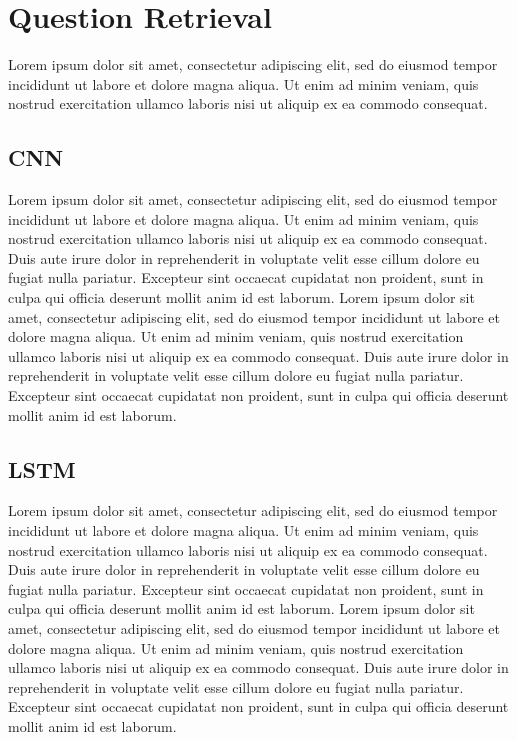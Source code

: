 \documentclass[12pt]{article}
\begin{document}
\section{Question Retrieval}
Lorem ipsum dolor sit amet, consectetur adipiscing elit, sed do eiusmod tempor incididunt ut labore et dolore magna aliqua. Ut enim ad minim veniam, quis nostrud exercitation ullamco laboris nisi ut aliquip ex ea commodo consequat.

\subsection{CNN}
Lorem ipsum dolor sit amet, consectetur adipiscing elit, sed do eiusmod tempor incididunt ut labore et dolore magna aliqua. Ut enim ad minim veniam, quis nostrud exercitation ullamco laboris nisi ut aliquip ex ea commodo consequat. Duis aute irure dolor in reprehenderit in voluptate velit esse cillum dolore eu fugiat nulla pariatur. Excepteur sint occaecat cupidatat non proident, sunt in culpa qui officia deserunt mollit anim id est laborum. Lorem ipsum dolor sit amet, consectetur adipiscing elit, sed do eiusmod tempor incididunt ut labore et dolore magna aliqua. Ut enim ad minim veniam, quis nostrud exercitation ullamco laboris nisi ut aliquip ex ea commodo consequat. Duis aute irure dolor in reprehenderit in voluptate velit esse cillum dolore eu fugiat nulla pariatur. Excepteur sint occaecat cupidatat non proident, sunt in culpa qui officia deserunt mollit anim id est laborum.

\subsection{LSTM}
Lorem ipsum dolor sit amet, consectetur adipiscing elit, sed do eiusmod tempor incididunt ut labore et dolore magna aliqua. Ut enim ad minim veniam, quis nostrud exercitation ullamco laboris nisi ut aliquip ex ea commodo consequat. Duis aute irure dolor in reprehenderit in voluptate velit esse cillum dolore eu fugiat nulla pariatur. Excepteur sint occaecat cupidatat non proident, sunt in culpa qui officia deserunt mollit anim id est laborum. Lorem ipsum dolor sit amet, consectetur adipiscing elit, sed do eiusmod tempor incididunt ut labore et dolore magna aliqua. Ut enim ad minim veniam, quis nostrud exercitation ullamco laboris nisi ut aliquip ex ea commodo consequat. Duis aute irure dolor in reprehenderit in voluptate velit esse cillum dolore eu fugiat nulla pariatur. Excepteur sint occaecat cupidatat non proident, sunt in culpa qui officia deserunt mollit anim id est laborum.
\end{document}
